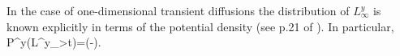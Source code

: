 \documentclass[11pt,reqno]{amsart}
\numberwithin{equation}{section}
\begin{document}
%
%
In the case of one-dimensional transient diffusions  the  distribution of $L^y_{\infty}$ is known explicitly in terms of the potential density (see p.21 of \cite{BorSal}). In particular, 
\be \label{e:lawLT}
P^y(L^y_{\infty}>t)=\exp\left(-\right).
\ee
%
\end{document}
